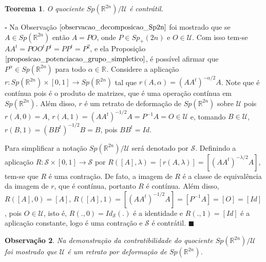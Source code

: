 \documentclass[12pt]{book}
\newtheorem{teorema}{Teorema}[section]
\newtheorem{observacao}[teorema]{Observação}
\newenvironment{prova}[1]{$\square$ #1}{\hfill$\blacksquare$}
\newcommand{\gruposimpletico}[1]{Sp(#1)}
\newcommand{\gruposimpleticopositivo}[1]{Sp_{+}(#1)}
\newcommand{\matrizSimpleticaOrtogonal}{\mathcal{U}}
\newcommand{\real}[1]{\mathbb{R}^{#1}}
\begin{document}
	\begin{teorema}
		O quociente $\gruposimpletico{\real{2n}}/\matrizSimpleticaOrtogonal$ é contrátil.
	\end{teorema}
	\begin{prova}
		Na Observação $\ref{observacao_decomposicao_Sp2n}$ foi mostrado que se $A \in \gruposimpletico{\real{2n}}$ então $A=PO$, onde $P \in \gruposimpleticopositivo{2n}$ e $O \in \matrizSimpleticaOrtogonal$. Com isso tem-se $AA^{t} = POO^{t}P^{t} = PP^{t}=P^{2}$, e ela Proposição $\ref{proposicao_potenciacao_grupo_simpletico}$, é possível afirmar que $P^{\alpha} \in \gruposimpletico{\real{2n}}$ para todo $\alpha \in \real{}$. Considere a aplicação $r:\gruposimpletico{\real{2n}}\times [0,1] \to \gruposimpletico{\real{2n}}$ tal que $r(A, \alpha) = (AA^{t})^{-\alpha/2}A$. Note que é contínua pois é o produto de matrizes, que é uma operação contínua em $\gruposimpletico{\real{2n}}$. Além disso, $r$ é um retrato de deformação de $\gruposimpletico{\real{2n}}$ sobre $\matrizSimpleticaOrtogonal$ pois $r(A, 0) = A$, $r(A, 1) = (AA^{t})^{-1/2}A = P^{-1}A = O \in \matrizSimpleticaOrtogonal$ e, tomando $B \in \matrizSimpleticaOrtogonal$, $r(B, 1) = (BB^{t})^{-1/2}B = B$, pois $BB^{t} = Id$.
		
		Para simplificar a notação $ \gruposimpletico{\real{2n}}/\matrizSimpleticaOrtogonal$ será denotado por $\mathcal{S}$. Definindo a aplicação $R:\mathcal{S} \times [0,1] \to \mathcal{S}$ por $R([A], \lambda) = [r(A, \lambda)] = [(AA^{t})^{-\lambda/2}A]$, tem-se que $R$ é uma contração. De fato, a imagem de $R$ é a classe de equivalência da imagem de $r$, que é contínua, portanto $R$ é contínua. Além disso, $R([A], 0) = [A]$, $R([A], 1) = [(AA^{t})^{-1/2}A] = [P^{-1}A] = [O] = [Id]$, pois $O \in \matrizSimpleticaOrtogonal$, isto é, $R(., 0) = Id_{\mathcal{S}}(.)$ é a identidade e $R(., 1) = [Id]$ é a aplicação constante, logo é uma contração e $\mathcal{S}$ é contrátil.
	\end{prova}
	
	\begin{observacao}\label{observacao_quociente_grupo_simpletico_contratil}
		Na demonstração da contratibilidade do quociente $\gruposimpletico{\real{2n}}/\matrizSimpleticaOrtogonal$ foi mostrado que $\matrizSimpleticaOrtogonal$ é um retrato por deformação de $\gruposimpletico{\real{2n}}$.
	\end{observacao}
	
\end{document}
